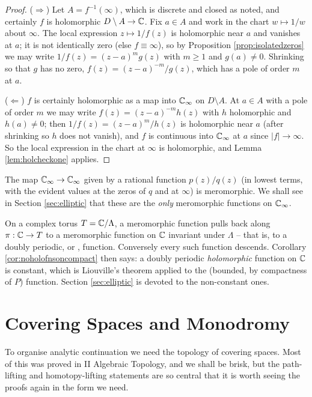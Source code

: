 \documentclass[a4paper]{scrartcl}
\newcommand{\Cinf}{\C_\infty}
\begin{document}
\begin{proof}
	($\Rightarrow$) Let $A = f^{-1}(\infty)$, which is discrete and closed as noted, and
	certainly $f$ is holomorphic $D \setminus A \to \mathbb{C}$. Fix $a \in A$ and work in the chart
	$w \mapsto 1/w$ about $\infty$. The local expression $z \mapsto 1/f(z)$ is holomorphic
	near $a$ and vanishes at $a$; it is not identically zero (else $f \equiv \infty$), so by
	Proposition \ref{prop:isolatedzeros} we may write $1/f(z) = (z-a)^m g(z)$ with $m \geq 1$
	and $g(a) \neq 0$. Shrinking so that $g$ has no zero, $f(z) = (z-a)^{-m}/g(z)$, which
	has a pole of order $m$ at $a$.

	($\Leftarrow$) $f$ is certainly holomorphic as a map into $\Cinf$ on $D \setminus A$.
	At $a \in A$ with a pole of order $m$ we may write $f(z) = (z-a)^{-m}h(z)$ with $h$
	holomorphic and $h(a)\neq 0$; then $1/f(z) = (z-a)^m/h(z)$ is holomorphic near $a$
	(after shrinking so $h$ does not vanish), and $f$ is continuous into $\Cinf$ at $a$
	since $|f| \to \infty$. So the local expression in the chart at $\infty$ is holomorphic,
	and Lemma \ref{lem:holcheckone} applies.
\end{proof}

\begin{example}
	The map $\Cinf \to \Cinf$ given by a rational function $p(z)/q(z)$ (in lowest terms,
	with the evident values at the zeros of $q$ and at $\infty$) is meromorphic. We shall
	see in Section \ref{sec:elliptic} that these are the \emph{only} meromorphic functions
	on $\Cinf$.
\end{example}

\begin{example}
	On a complex torus $T = \mathbb{C}/\Lambda$, a meromorphic function pulls back along
	$\pi : \mathbb{C} \to T$ to a meromorphic function on $\mathbb{C}$ invariant under $\Lambda$ -- that
	is, to a doubly periodic, or , function. Conversely every such function
	descends. Corollary \ref{cor:noholofnsoncompact} then says: a doubly periodic
	\emph{holomorphic} function on $\mathbb{C}$ is constant, which is Liouville's theorem applied
	to the (bounded, by compactness of $P$) function. Section \ref{sec:elliptic} is devoted
	to the non-constant ones.
\end{example}

\section{Covering Spaces and Monodromy}

To organise analytic continuation we need the topology of covering spaces. Most of this
was proved in II Algebraic Topology, and we shall be brisk, but the path-lifting and
homotopy-lifting statements are so central that it is worth seeing the proofs again in
the form we need.
\end{document}
